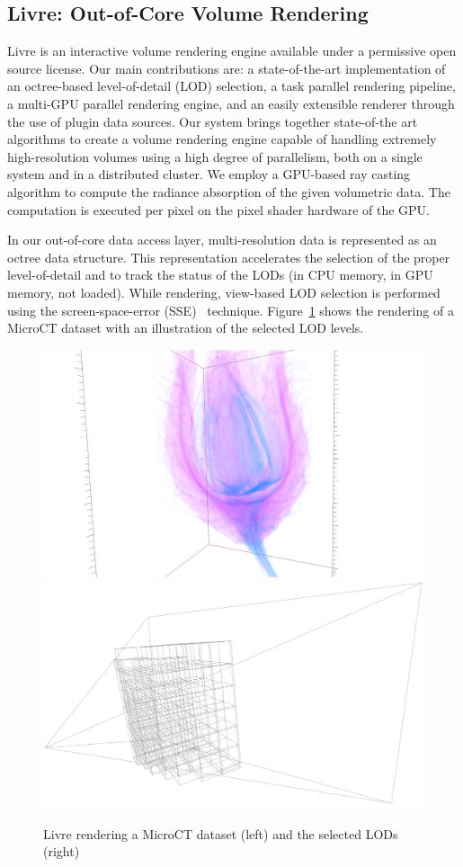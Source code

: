 \documentclass[10pt]{llncs}
\newcommand{\fig}[1]{Figure~\ref{#1}}
\begin{document}
\subsection{Livre: Out-of-Core Volume Rendering}

Livre is an interactive volume rendering engine available under a permissive
open source license. Our main contributions are: a state-of-the-art
implementation of an octree-based level-of-detail (LOD) selection, a task
parallel rendering pipeline, a multi-GPU parallel rendering engine, and an
easily extensible renderer through the use of plugin data sources. Our system
brings together state-of-the art algorithms to create a volume rendering engine
capable of handling extremely high-resolution volumes using a high degree of
parallelism, both on a single system and in a distributed cluster. We employ a
GPU-based ray casting algorithm to compute the radiance absorption of the given
volumetric data. The computation is executed per pixel on the pixel shader
hardware of the GPU.

In our out-of-core data access layer, multi-resolution data is represented as an
octree data structure. This representation accelerates the selection of the
proper level-of-detail and to track the status of the LODs (in CPU memory, in
GPU memory, not loaded). While rendering, view-based LOD selection is performed
using the screen-space-error (SSE)~\cite{guthe2004} technique. \fig{fLivre}
shows the rendering of a MicroCT dataset with an illustration of the selected
LOD levels.

\begin{figure}[t]
    \includegraphics[width=.49\columnwidth]{images/livre}\hfill
    \includegraphics[width=.49\columnwidth]{images/livreLOD}
  \caption{\label{fLivre}Livre rendering a MicroCT dataset (left) and
    the selected LODs (right)}
\end{figure}
\end{document}
